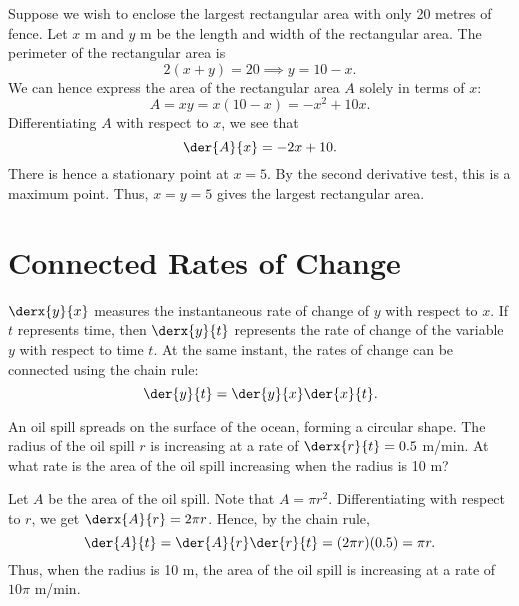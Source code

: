 \begin{example}
    Suppose we wish to enclose the largest rectangular area with only 20 metres of fence. Let $x$ m and $y$ m be the length and width of the rectangular area. The perimeter of the rectangular area is \[2(x + y) = 20 \implies y = 10 - x.\] We can hence express the area of the rectangular area $A$ solely in terms of $x$: \[A = xy = x(10 - x) = -x^2 + 10x.\] Differentiating $A$ with respect to $x$, we see that \[\der{A}{x} = -2x + 10.\] There is hence a stationary point at $x = 5$. By the second derivative test, this is a maximum point. Thus, $x = y = 5$ gives the largest rectangular area.
\end{example}

\section{Connected Rates of Change}

$\derx{y}{x}$ measures the instantaneous rate of change of $y$ with respect to $x$. If $t$ represents time, then $\derx{y}{t}$ represents the rate of change of the variable $y$ with respect to time $t$. At the same instant, the rates of change can be connected using the chain rule: \[\der{y}{t} = \der{y}{x} \der{x}{t}.\]

\begin{sample}
    An oil spill spreads on the surface of the ocean, forming a circular shape. The radius of the oil spill $r$ is increasing at a rate of $\derx{r}{t} = 0.5$ m/min. At what rate is the area of the oil spill increasing when the radius is 10 m?
\end{sample}
\begin{sampans}
    Let $A$ be the area of the oil spill. Note that $A = \pi r^2$. Differentiating with respect to $r$, we get $\derx{A}{r} = 2\pi r$. Hence, by the chain rule, \[\der{A}{t} = \der{A}{r} \der{r}{t} = (2\pi r) (0.5) = \pi r.\] Thus, when the radius is 10 m, the area of the oil spill is increasing at a rate of $10\pi$ m/min.
\end{sampans}